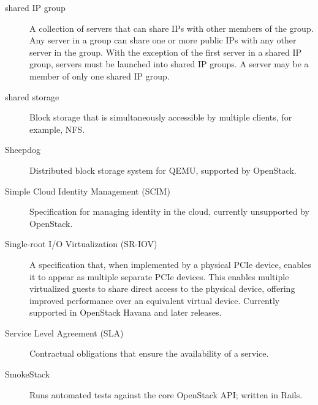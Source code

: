 \documentclass[letterpaper,10pt,english]{sphinxmanual}
\begin{document}
\begin{description}
\item[{shared IP group}] \leavevmode{}\label{_source/glossary:term-shared-ip-group}
A collection of servers that can share IPs with other members of
the group. Any server in a group can share one or more public IPs with
any other server in the group. With the exception of the first server
in a shared IP group, servers must be launched into shared IP groups.
A server may be a member of only one shared IP group.

\item[{shared storage}] \leavevmode{}\label{_source/glossary:term-shared-storage}
Block storage that is simultaneously accessible by multiple
clients, for example, NFS.

\item[{Sheepdog}] \leavevmode{}\label{_source/glossary:term-sheepdog}
Distributed block storage system for QEMU, supported by
OpenStack.

\item[{Simple Cloud Identity Management (SCIM)}] \leavevmode{}\label{_source/glossary:term-simple-cloud-identity-management-scim}
Specification for managing identity in the cloud, currently
unsupported by OpenStack.

\item[{Single-root I/O Virtualization (SR-IOV)}] \leavevmode{}\label{_source/glossary:term-single-root-i-o-virtualization-sr-iov}
A specification that, when implemented by a physical PCIe
device, enables it to appear as multiple separate PCIe devices. This
enables multiple virtualized guests to share direct access to the
physical device, offering improved performance over an equivalent
virtual device. Currently supported in OpenStack Havana and later
releases.

\item[{Service Level Agreement (SLA)}] \leavevmode{}\label{_source/glossary:term-service-level-agreement-sla}
Contractual obligations that ensure the availability of a
service.

\item[{SmokeStack}] \leavevmode{}\label{_source/glossary:term-smokestack}
Runs automated tests against the core OpenStack API; written in
Rails.


\end{description}
\end{document}
